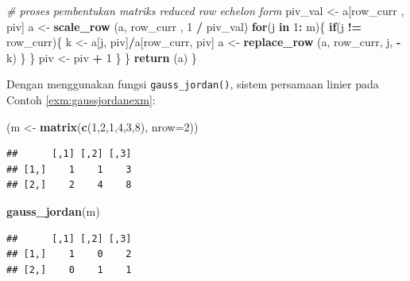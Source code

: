 \documentclass[]{book}
\newenvironment{Shaded}{\begin{snugshade}}{\end{snugshade}}
\newcommand{\CommentTok}[1]{\textcolor[rgb]{0.56,0.35,0.01}{\textit{#1}}}
\newcommand{\ControlFlowTok}[1]{\textcolor[rgb]{0.13,0.29,0.53}{\textbf{#1}}}
\newcommand{\DataTypeTok}[1]{\textcolor[rgb]{0.13,0.29,0.53}{#1}}
\newcommand{\DecValTok}[1]{\textcolor[rgb]{0.00,0.00,0.81}{#1}}
\newcommand{\KeywordTok}[1]{\textcolor[rgb]{0.13,0.29,0.53}{\textbf{#1}}}
\newcommand{\NormalTok}[1]{#1}
\newcommand{\OperatorTok}[1]{\textcolor[rgb]{0.81,0.36,0.00}{\textbf{#1}}}
\newcommand{\StringTok}[1]{\textcolor[rgb]{0.31,0.60,0.02}{#1}}
\theoremstyle{definition}
\theoremstyle{definition}
\theoremstyle{definition}
\theoremstyle{remark}
\begin{document}
\begin{Shaded}
\begin{Highlighting}[]
\CommentTok{# proses pembentukan matriks reduced row echelon form}
\NormalTok{            piv_val <-}\StringTok{ }\NormalTok{a[row_curr , piv]}
\NormalTok{            a <-}\StringTok{ }\KeywordTok{scale_row}\NormalTok{ (a, row_curr , }\DecValTok{1} \OperatorTok{/}\StringTok{ }\NormalTok{piv_val)}
            \ControlFlowTok{for}\NormalTok{(j }\ControlFlowTok{in} \DecValTok{1}\OperatorTok{:}\StringTok{ }\NormalTok{m)\{}
                \ControlFlowTok{if}\NormalTok{(j }\OperatorTok{!=}\StringTok{ }\NormalTok{row_curr)\{}
\NormalTok{                    k <-}\StringTok{ }\NormalTok{a[j, piv]}\OperatorTok{/}\NormalTok{a[row_curr, piv]}
\NormalTok{                    a <-}\StringTok{ }\KeywordTok{replace_row}\NormalTok{ (a, row_curr, j, }\OperatorTok{-}\NormalTok{k)}
\NormalTok{                \}}
\NormalTok{            \}}
\NormalTok{            piv <-}\StringTok{ }\NormalTok{piv }\OperatorTok{+}\StringTok{ }\DecValTok{1}
\NormalTok{        \}}
\NormalTok{    \}}
    \KeywordTok{return}\NormalTok{ (a)}
\NormalTok{\}}
\end{Highlighting}
\end{Shaded}

Dengan menggunakan fungsi \texttt{gauss\_jordan()}, sistem persamaan linier pada Contoh \ref{exm:gaussjordanexm}:

\begin{Shaded}
\begin{Highlighting}[]
\NormalTok{(m <-}\StringTok{ }\KeywordTok{matrix}\NormalTok{(}\KeywordTok{c}\NormalTok{(}\DecValTok{1}\NormalTok{,}\DecValTok{2}\NormalTok{,}\DecValTok{1}\NormalTok{,}\DecValTok{4}\NormalTok{,}\DecValTok{3}\NormalTok{,}\DecValTok{8}\NormalTok{), }\DataTypeTok{nrow=}\DecValTok{2}\NormalTok{))}
\end{Highlighting}
\end{Shaded}

\begin{verbatim}
##      [,1] [,2] [,3]
## [1,]    1    1    3
## [2,]    2    4    8
\end{verbatim}

\begin{Shaded}
\begin{Highlighting}[]
\KeywordTok{gauss_jordan}\NormalTok{(m)}
\end{Highlighting}
\end{Shaded}

\begin{verbatim}
##      [,1] [,2] [,3]
## [1,]    1    0    2
## [2,]    0    1    1
\end{verbatim}
\end{document}

